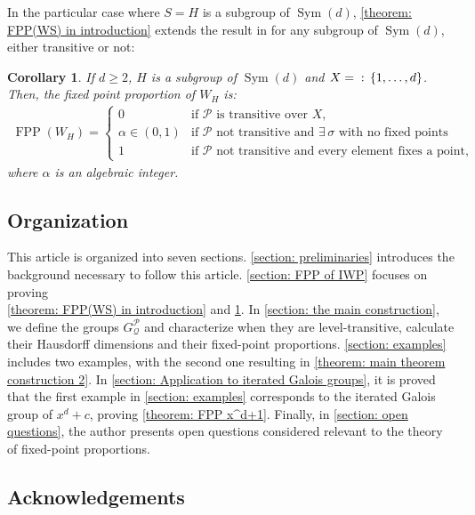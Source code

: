 \documentclass{amsart}
\def\set#1{{\def\st{\;:\;}\left\{#1\right\}}}
\DeclareMathOperator{\FPP}{FPP}
\DeclareMathOperator{\Sym}{Sym}
\DeclareMathOperator{\st}{st}
\newtheorem{Corollary}[Theorem]{Corollary}
\begin{document}
In the particular case where $S = H$ is a subgroup of $\Sym(d)$, \cref{theorem: FPP(WS) in introduction} extends the result in \cite[Corollary 2.6]{AbertVirag2004} for any subgroup of $\Sym(d)$, either transitive or not:

\begin{Corollary}
If $d \geq 2$, $H$ is a subgroup of $\Sym(d)$ and $X = \set{1,\dots,d}$. Then, the fixed point proportion of $W_H$ is: 
\begin{align*}
\FPP(W_H) = \left \{ \begin{matrix} 
0 & \mbox{if $\mathcal{P}$ is transitive over $X$,} \\ 
\alpha \in (0,1) & \mbox{if $\mathcal{P}$ not transitive and $\exists \, \sigma$ with no fixed points} \\
1 & \mbox{if $\mathcal{P}$ not transitive and every element fixes a point,}
\end{matrix}\right.
\end{align*}
where $\alpha$ is an algebraic integer.
\label{Corollary: FPP iterated wreath products}
\end{Corollary}

\subsection*{Organization}

This article is organized into seven sections. \cref{section: preliminaries} introduces the background necessary to follow this article. \cref{section: FPP of IWP} focuses on proving \\ \cref{theorem: FPP(WS) in introduction} and \cref{Corollary: FPP iterated wreath products}. In \cref{section: the main construction}, we define the groups $G_\mathcal{Q}^\mathcal{P}$ and characterize when they are level-transitive, calculate their Hausdorff dimensions and their fixed-point proportions. \cref{section: examples} includes two examples, with the second one resulting in \cref{theorem: main theorem construction 2}. In \cref{section: Application to iterated Galois groups}, it is proved that the first example in \cref{section: examples} corresponds to the iterated Galois group of $x^d+c$, proving \cref{theorem: FPP x^d+1}. Finally, in \cref{section: open questions}, the author presents open questions considered relevant to the theory of fixed-point proportions.


\subsection*{Acknowledgements}
\end{document}
